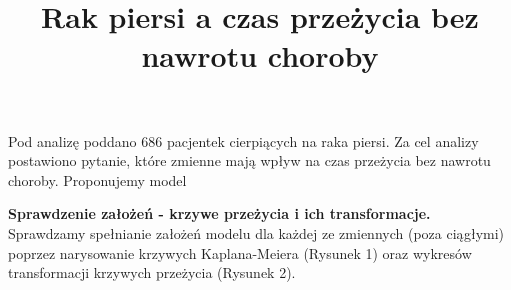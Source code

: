 \documentclass[]{article}
\title{Rak piersi a czas przeżycia bez nawrotu choroby}
\author{}
\date{}
\begin{document}
\maketitle


\thispagestyle{fancy}

Pod analizę poddano 686 pacjentek cierpiących na raka piersi. Za cel
analizy postawiono pytanie, które zmienne mają wpływ na czas przeżycia
bez nawrotu choroby. Proponujemy model

\textbf{Sprawdzenie założeń - krzywe przeżycia i ich transformacje.}
\newline
Sprawdzamy spełnianie założeń modelu dla każdej ze zmiennych (poza
ciągłymi) poprzez narysowanie krzywych Kaplana-Meiera (Rysunek 1) oraz
wykresów transformacji  krzywych przeżycia
(Rysunek 2).
\end{document}
